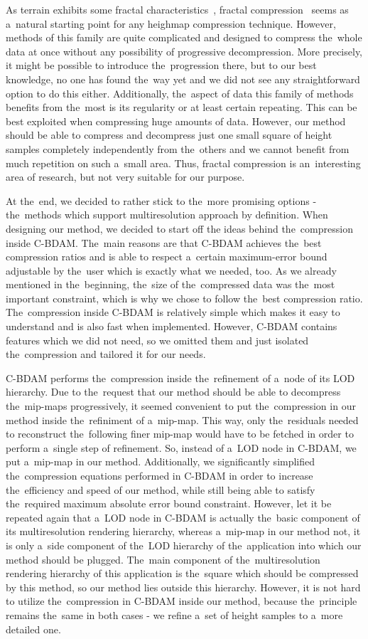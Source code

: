  As terrain exhibits some fractal characteristics~\cite{fractalChar}, fractal compression~\cite{fractal} seems as a~natural starting point for any heighmap compression technique. However, methods of this family are quite complicated and designed to compress the~whole data at once without any possibility of progressive decompression. More precisely, it might be possible to introduce the~progression there, but to our best knowledge, no one has found the~way yet and we did not see any straightforward option to do this either. Additionally, the~aspect of data this family of methods benefits from the~most is its regularity or at least certain repeating. This can be best exploited when compressing huge amounts of data. However, our method should be able to compress and decompress just one small square of height samples completely independently from the~others and we cannot benefit from much repetition on such a~small area. Thus, fractal compression is an~interesting area of research, but not very suitable for our purpose.
  
 At the~end, we decided to rather stick to the~more promising options - the~methods which support multiresolution approach by definition. When designing our method, we decided to start off the ideas behind the~compression inside C-BDAM. The~main reasons are that C-BDAM achieves the~best compression ratios and is able to respect a~certain maximum-error bound adjustable by the~user which is exactly what we needed, too. As we already mentioned in the~beginning, the~size of the~compressed data was the~most important constraint, which is why we chose to follow the~best compression ratio. The~compression inside C-BDAM is relatively simple which makes it easy to understand and is also fast when implemented. However, C-BDAM contains features which we did not need, so we omitted them and just isolated the~compression and tailored it for our needs. 
 
 C-BDAM performs the~compression inside the~refinement of a~node of its LOD hierarchy. Due to the~request that our method should be able to decompress the~mip-maps progressively, it seemed convenient to put the~compression in our method inside the~refiniment of a~mip-map. This way, only the~residuals needed to reconstruct the~following finer mip-map would have to be fetched in order to perform a~single step of refinement. So, instead of a~LOD node in C-BDAM, we put a~mip-map in our method.  Additionally, we significantly simplified the~compression equations performed in C-BDAM in order to increase the~efficiency and speed of our method, while still being able to satisfy the~required maximum absolute error bound constraint. However, let it be repeated again that a~LOD node in C-BDAM is actually the~basic component of its multiresolution rendering hierarchy, whereas a~mip-map in our method not, it is only a~side component of the~LOD hierarchy of the~application into which our method should be plugged. The~main component of the~multiresolution rendering hierarchy of this application is the~square which should be compressed by this method, so our method lies outside this hierarchy. However, it is not hard to utilize the~compression in C-BDAM inside our method, because the~principle remains the~same in both cases - we refine a~set of height samples to a~more detailed one.
